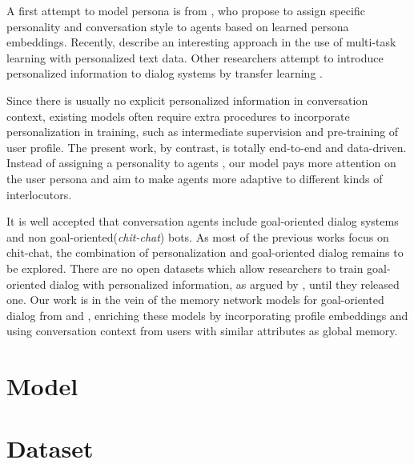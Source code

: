 \documentclass[11pt,a4paper]{article}
\begin{document}
A first attempt to model persona is from \citet{li-EtAl:2016:P16-13}, who propose to assign specific personality and conversation style to agents based on learned persona embeddings.
Recently, \citet{DBLP:journals/corr/abs-1710-07388} describe an interesting approach in the use of multi-task learning with personalized text data.
Other researchers attempt to introduce personalized information to dialog systems by transfer learning \cite{Yang:2017:PRG:3077136.3080706, DBLP:journals/corr/ZhangLWZ17}.

Since there is usually no explicit personalized information in conversation context, existing models \cite{Qian2017AssigningPT, herzig-EtAl:2017:INLG2017} often require extra procedures to incorporate personalization in training, such as intermediate supervision and pre-training of user profile. 
The present work, by contrast, is totally end-to-end and data-driven.
Instead of assigning a personality to agents \cite{li-EtAl:2016:P16-13, DBLP:journals/corr/abs-1710-07388, Qian2017AssigningPT}, our model pays more attention on the user persona and aim to make agents more adaptive to different kinds of interlocutors.

It is well accepted that conversation agents include goal-oriented dialog systems and non goal-oriented(\textit{chit-chat}) bots. 
As most of the previous works \cite{li-EtAl:2016:P16-13, Liu2018ContentOrientedUM, Qian2017AssigningPT} focus on chit-chat, the combination of personalization and goal-oriented dialog remains to be explored.
There are no open datasets which allow researchers to train goal-oriented dialog with personalized information, as argued by \citet{DBLP:journals/corr/JoshiMF17}, until they released one.
Our work is in the vein of the memory network models for goal-oriented dialog from \citet{NIPS2015_MemN2N} and \citet{bordes2016learning}, enriching these models by incorporating profile embeddings and using conversation context from users with similar attributes as global memory.

\section{Model}

\section{Dataset}
\end{document}

